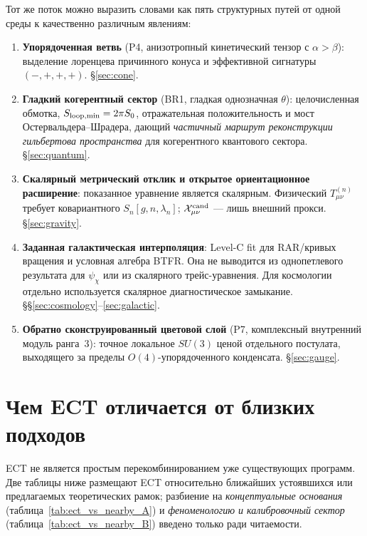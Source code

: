 \documentclass[11pt,a4paper]{article}
\begin{document}
Тот же поток можно выразить словами как пять структурных путей от
одной среды к качественно различным явлениям:

\begin{enumerate}[leftmargin=1.4em,itemsep=2pt]
\item \textbf{Упорядоченная ветвь} (P4, анизотропный кинетический
      тензор с $\alpha>\beta$): выделение лоренцева причинного
      конуса и эффективной сигнатуры $(-,+,+,+)$.
      \S\ref{sec:cone}.
\item \textbf{Гладкий когерентный сектор}
      (BR1, гладкая однозначная $\theta$): целочисленная обмотка,
      $S_{\rm loop,min}=2\pi S_0$, отражательная положительность
      и мост Остервальдера--Шрадера, дающий
      \emph{частичный маршрут реконструкции гильбертова
      пространства} для когерентного квантового сектора.
      \S\ref{sec:quantum}.
\item \textbf{Скалярный метрический отклик и открытое
      ориентационное расширение}: показанное уравнение является
      скалярным.  Физический $T^{(n)}_{\mu\nu}$ требует ковариантного
      $S_n[g,n,\lambda_n]$; $\mathcal X^{\rm cand}_{\mu\nu}$ — лишь
      внешний прокси.  \S\ref{sec:gravity}.
\item \textbf{Заданная галактическая интерполяция}: Level-C
      fit для RAR/кривых вращения и условная алгебра BTFR.  Она не
      выводится из однопетлевого результата для $\psi_\chi$ или из
      скалярного трейс-уравнения.  Для космологии отдельно используется
      скалярное диагностическое замыкание.
      \S\S\ref{sec:cosmology}--\ref{sec:galactic}.
\item \textbf{Обратно сконструированный цветовой слой}
      (P7, комплексный внутренний модуль ранга~3): точное
      локальное $SU(3)$ ценой отдельного постулата, выходящего за
      пределы $O(4)$-упорядоченного конденсата.
      \S\ref{sec:gauge}.
\end{enumerate}

\section{Чем ECT отличается от близких подходов}
\label{sec:comparison}

ECT не является простым перекомбинированием уже существующих
программ. Две таблицы ниже размещают ECT относительно ближайших
устоявшихся или предлагаемых теоретических рамок; разбиение на
\emph{концептуальные основания}
(таблица~\ref{tab:ect_vs_nearby_A}) и
\emph{феноменологию и калибровочный сектор}
(таблица~\ref{tab:ect_vs_nearby_B}) введено только ради
читаемости.
\end{document}
